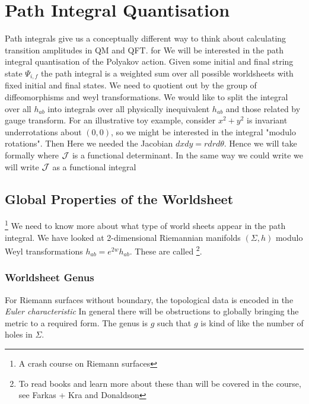 \documentclass{article}
\begin{document}
\section{Path Integral Quantisation}
Path integrals give us a conceptually different way to think about calculating transition amplitudes in QM and QFT. 
for 
We will be interested in the path integral quantisation of the Polyakov action. 
Given some initial and final string state $\Psi_{i,f}$ the path integral is  
a weighted sum over all possible worldsheets with fixed initial and final states. 
We need to quotient out by the group of diffeomorphisms and weyl transformations. We would like to split the integral over all $h_{ab}$ into integrals over all physically inequivalent $h_{ab}$ and those related by gauge transform. 
For an illustrative toy example, consider 
$x^2 + y^2$ is invariant underrotations about $(0,0)$, so we might be interested in the integral "modulo rotations". Then 
Here we needed the Jacobian $dxdy = rdrd\theta$. Hence we will take formally 
where $\mathcal{J}$ is a functional determinant. In the same way we could write 
we will write $\mathcal{J}$ as a functional integral 

\subsection{Global Properties of the Worldsheet}\footnote{A crash course on Riemann surfaces}
We need to know more about what type of world sheets appear in the path integral. We have looked at 2-dimensional Riemannian manifolds $(\Sigma,h)$ modulo Weyl transformations $h_{ab}=e^{2w}h_{ab}$. These are called \footnote{To read books and learn more about these than will be covered in the course, see Farkas + Kra and Donaldson}.

\subsubsection*{Worldsheet Genus}
For Riemann surfaces without boundary, the topological data is encoded in the \emph{Euler characteristic}
In general there will be obstructions to globally bringing the metric to a required form.
The genus is $g$ such that 
$g$ is kind of like the number of holes in $\Sigma$. 
\end{document}
